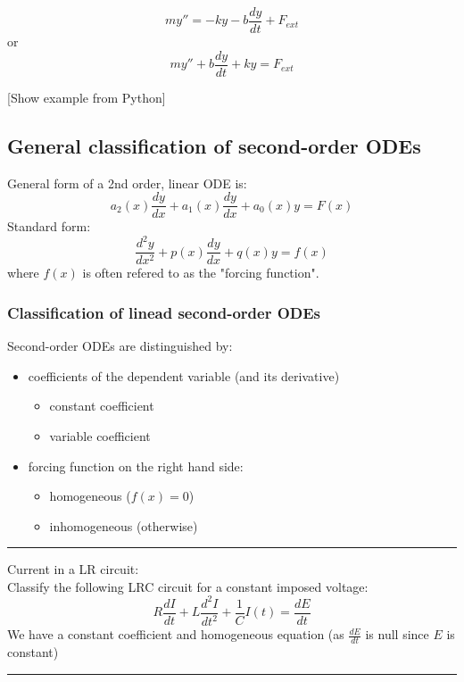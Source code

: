 \begin{equation*}
my'' =- ky -b\frac{dy}{dt}+F_{ext}
\end{equation*}
or
\begin{equation}
\boxed{my'' +b\frac{dy}{dt}+ ky =F_{ext}}
\end{equation}


[Show example from Python]

\subsection{General classification of second-order ODEs}
General form of a 2nd order, linear ODE is:
\begin{equation*}
\boxed{a_2(x)\frac{dy}{dx} +a_1(x)\frac{dy}{dx}+ a_0(x)y =F(x)}
\end{equation*}
Standard form:
\begin{equation*}
\boxed{\frac{d^2y}{dx^2} +p(x)\frac{dy}{dx}+ q(x) y=f(x)}
\end{equation*}
where $f(x)$ is often refered to as the "forcing function".



\subsubsection{Classification of linead second-order ODEs}
Second-order ODEs are distinguished by:
\begin{itemize}
\item coefficients of the dependent variable (and its derivative)
\begin{itemize}
\item constant coefficient 
\item variable coefficient
\end{itemize}
\item forcing function on the right hand side:
\begin{itemize}
\item homogeneous ($f(x)=0$)
\item inhomogeneous (otherwise)
\end{itemize}
\end{itemize}

\begin{center}
\noindent\rule{4cm}{0.4pt}
\end{center}

\begin{exmp}{Current in a LR circuit:}\\
Classify the following LRC circuit for a constant imposed voltage:
\begin{equation}
R\frac{dI}{dt}+L\frac{d^2I}{dt^2}+\frac{1}{C}I(t)=\frac{dE}{dt}
\end{equation}
We have a constant coefficient and homogeneous equation (as $\frac{dE}{dt}$ is null since $E$ is constant)
\end{exmp}
\begin{center}
\noindent\rule{4cm}{0.4pt}
\end{center}

